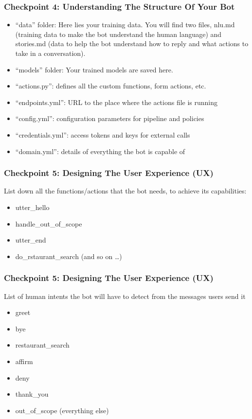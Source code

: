 \begin{frame}\frametitle{Checkpoint 4: Understanding The Structure Of Your Bot}
\begin{itemize}
\item ``data'' folder: Here lies your training data. You will find two files, nlu.md (training data to make the bot understand the human language) and stories.md (data to help the bot understand how to reply and what actions to take in a conversation).
\item ``models'' folder: Your trained models are saved  here.
\item ``actions.py'': defines all the custom functions, form actions, etc.
\item ``endpoints.yml'': URL to the place where the actions file is running
\item ``config.yml'': configuration parameters for pipeline and policies
\item ``credentials.yml'': access tokens and keys for external calls
\item ``domain.yml'': details of everything the bot is capable of
\end{itemize}
\end{frame}

\begin{frame}\frametitle{Checkpoint 5: Designing The User Experience (UX)}
List down all the functions/actions that the bot needs, to achieve its capabilities:
 \begin{itemize}
\item utter\_hello
\item handle\_out\_of\_scope
\item utter\_end
\item do\_rstaurant\_search (and so on \ldots)
\end{itemize}
\end{frame}

\begin{frame}\frametitle{Checkpoint 5: Designing The User Experience (UX)}
List of human intents the bot will have to detect from the messages users send it
 \begin{itemize}
\item greet
\item bye
\item restaurant\_search
\item affirm
\item deny
\item thank\_you
\item out\_of\_scope (everything else)
\end{itemize}
\end{frame}

